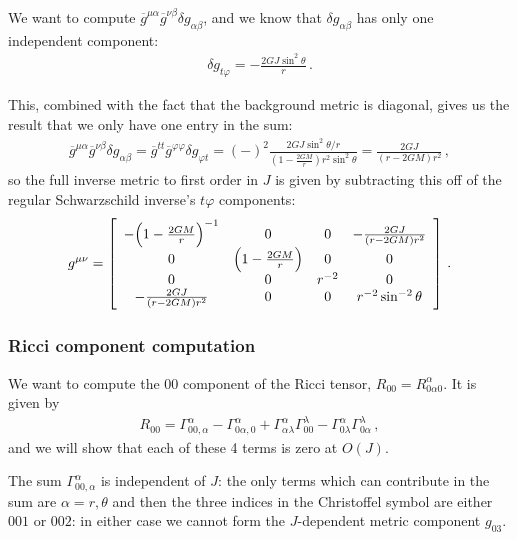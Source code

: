 \documentclass[main.tex]{subfiles}
\begin{document}
We want to compute \(\overline{g}^{\mu \alpha } \overline{g}^{\nu \beta } \delta g_{\alpha \beta }\), and we know that \(\delta g_{\alpha \beta } \) has only one independent component: 
%
\begin{align}
  \delta g_{t \varphi } = - \frac{2 GJ  \sin^2\theta }{r}
\,.
\end{align}

This, combined with the fact that the background metric is diagonal, gives us the result that we only have one entry in the sum: 
%
\begin{align}
  \overline{g}^{\mu \alpha } \overline{g}^{\nu \beta } \delta g_{\alpha \beta }
  = \overline{g}^{tt} \overline{g}^{\varphi \varphi }
  \delta g_{\varphi  t}
  =(-)^2 \frac{2GJ \sin^2 \theta /r }{(1 - \frac{2GM}{r}) r^2 \sin^2 \theta }
  = \frac{2GJ}{(r - 2GM) r^2}
  \,,
\end{align}
%
so the  full inverse metric to first order in \(J\) is given by subtracting this off of the regular Schwarzschild inverse's \(t \varphi \) components: 
%
\begin{align}
  g^{\mu \nu } = \left[\begin{array}{cccc}
    -\qty(1 -\frac{2GM}{r})^{-1}  & 0 & 0 & -\frac{2GJ}{(r - 2GM)r^2} \\ 
    0 & \qty(1- \frac{2GM}{r}) & 0 & 0 \\ 
    0 & 0 & r^{-2} & 0 \\ 
    -\frac{2GJ}{(r - 2GM)r^2} & 0 & 0 & r^{-2} \sin^{-2} \theta 
    \end{array}\right]  
\,.
\end{align}

\subsubsection{Ricci component computation}

We want to compute the 00 component of the Ricci tensor, \(R_{00} = R^{\alpha }_{0 \alpha 0}\). It is given by 
%
\begin{align}
  R_{00} = \Gamma^{\alpha }_{00, \alpha }
  - \Gamma^{\alpha }_{0 \alpha, 0}
  + \Gamma^{\alpha }_{\alpha \lambda }
  \Gamma^{\lambda }_{00}
  - \Gamma^{\alpha }_{0\lambda } 
  \Gamma^{\lambda }_{0 \alpha }
\,,
\end{align}
%
and we will show that each of these 4 terms is zero at \(O(J)\). 

The sum \(\Gamma^{\alpha }_{00, \alpha } \) is independent of \(J\): the only terms which can contribute in the sum are \(\alpha = r, \theta \) and then the three indices in the Christoffel symbol are either \(001\) or \(002\): in either case we cannot form the \(J\)-dependent metric component \(g_{03}\). 
\end{document}

